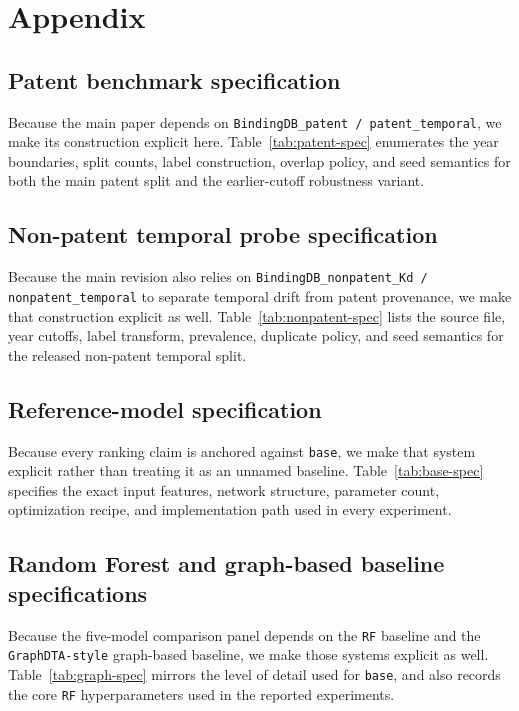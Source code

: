 \section{Appendix}

\subsection{Patent benchmark specification}

Because the main paper depends on \texttt{BindingDB\_patent / patent\_temporal}, we make its construction explicit here. Table~\ref{tab:patent-spec} enumerates the year boundaries, split counts, label construction, overlap policy, and seed semantics for both the main patent split and the earlier-cutoff robustness variant.



\subsection{Non-patent temporal probe specification}

Because the main revision also relies on \texttt{BindingDB\_nonpatent\_Kd / nonpatent\_temporal} to separate temporal drift from patent provenance, we make that construction explicit as well. Table~\ref{tab:nonpatent-spec} lists the source file, year cutoffs, label transform, prevalence, duplicate policy, and seed semantics for the released non-patent temporal split.



\subsection{Reference-model specification}

Because every ranking claim is anchored against \texttt{base}, we make that system explicit rather than treating it as an unnamed baseline. Table~\ref{tab:base-spec} specifies the exact input features, network structure, parameter count, optimization recipe, and implementation path used in every experiment.



\subsection{Random Forest and graph-based baseline specifications}

Because the five-model comparison panel depends on the \texttt{RF} baseline and the \texttt{GraphDTA-style} graph-based baseline, we make those systems explicit as well. Table~\ref{tab:graph-spec} mirrors the level of detail used for \texttt{base}, and also records the core \texttt{RF} hyperparameters used in the reported experiments.

